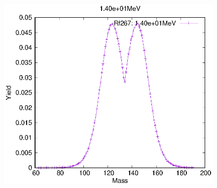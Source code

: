 \begin{figure}[htbp]
\begin{minipage}{0.33\textwidth} \begin{center} \includegraphics[width=\textwidth]{YA/Rf267_1.40e+01.eps} \end{center} \end{minipage}
\end{figure}
\clearpage

